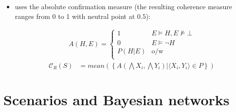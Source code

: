 \documentclass[10pt,]{scrartcl}
\begin{document}
\begin{itemize}




\item  \citet{Roche2013Coherence} uses the
absolute confirmation measure (the resulting coherence measure ranges from 0 to 1 with neutral point at $0.5$): 

\begin{align*}
    A(H,E) = \begin{cases}
    1 & E\models H, E\not \models \bot \\
    0 & E \models \neg H\\
    P(H|E) & \mbox{o/w} \\
    \end{cases}
\end{align*}
\begin{align}
\tag{Roche}  
    \mathcal{C}_{R}(S) & =
mean\left(\left\{A(\bigwedge X_i, \bigwedge Y_i) | \langle X_i, Y_i\rangle \in P\right\} \right) 
\end{align}



\end{itemize}











\section{Scenarios and Bayesian networks}\label{sec:senariosAndBns}
\end{document}
